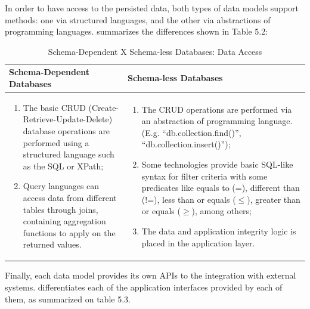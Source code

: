 \newpage

In order to have access to the persisted data, both types of data models
support methods: one via structured languages, and the other via abstractions
of programming languages. \cite{db-is-rdbs-dommed} summarizes the differences
shown in Table 5.2:

\begin{table}[!h]
    \label{tab:daccess-schema-vs-schemaless}
    \caption{Schema-Dependent X Schema-less Databases: Data Access}
    \begin{center}
    \begin{tabular}{|p{210pt}|p{210pt}|}\hline
    Schema-Dependent Databases & Schema-less Databases\\\hline
    \begin{enumerate}
      \item The basic CRUD (Create-Retrieve-Update-Delete)
      database operations are performed using a structured language such
      as the SQL or XPath;
      \item Query languages can access data from different tables through
      joins, containing aggregation functions to apply on the returned values.
    \end{enumerate} 
    & 
    \begin{enumerate}
      \item The CRUD operations are performed via an abstraction of
      programming language. (E.g. ``db.collection.find()'',
      ``db.collection.insert()'');
      \item Some technologies provide basic SQL-like syntax for filter criteria
      with some predicates like equals to (=), different than (!=), less than
      or equals ($\leq$), greater than or equals ($\geq$), among others;
      \item The data and application integrity logic is placed in the
      application layer.
    \end{enumerate}
    \\\hline
    \end{tabular}
    \end{center}
\end{table}

Finally, each data model provides its own APIs to the integration with external
systems. \cite{db-is-rdbs-dommed} differentiates each of the application interfaces
provided by each of them, as summarized on table 5.3.

